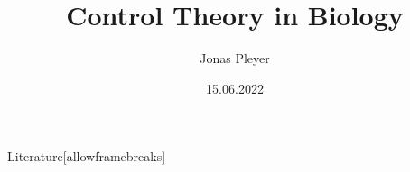 \documentclass[10pt, compress, handout]{beamer}
\title{Control Theory in Biology}
\subtitle{}
\date{15.06.2022}
\author{Jonas Pleyer}
\institute{Freiburg Center for Data Analysis and Modeling (FDM)}
\begin{document}
\maketitle







\begin{frame}{Literature}[allowframebreaks]
    
    
\end{frame}
% 
%
\end{document}
